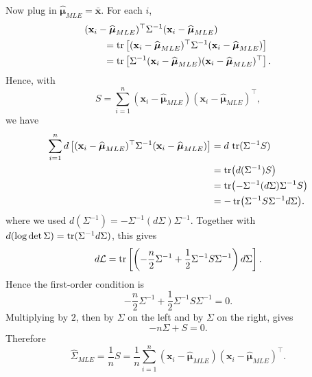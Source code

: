 \begin{pfbox}
Now plug in $\widehat{\boldsymbol{\mu}}_{MLE}=\bar{\mathbf{x}}$.
For each $i$,
\[
\begin{aligned}
    &(\mathbf{x}_i-\widehat{\boldsymbol{\mu}}_{MLE})^{\top}
    \Sigma^{-1}
    (\mathbf{x}_i-\widehat{\boldsymbol{\mu}}_{MLE})                 \\
    &\qquad =
    \operatorname{tr}\left[
        (\mathbf{x}_i-\widehat{\boldsymbol{\mu}}_{MLE})^{\top}
        \Sigma^{-1}
        (\mathbf{x}_i-\widehat{\boldsymbol{\mu}}_{MLE})
    \right]                                                        \\
    &\qquad =
    \operatorname{tr}\left[
        \Sigma^{-1}
        (\mathbf{x}_i-\widehat{\boldsymbol{\mu}}_{MLE})
        (\mathbf{x}_i-\widehat{\boldsymbol{\mu}}_{MLE})^{\top}
    \right].
\end{aligned}
\]
Hence, with
\[
    S
    =
    \sum_{i=1}^n
    (\mathbf{x}_i-\widehat{\boldsymbol{\mu}}_{MLE})
    (\mathbf{x}_i-\widehat{\boldsymbol{\mu}}_{MLE})^{\top},
\]
we have
\[
\begin{aligned}
    \sum_{i=1}^n
    d\left[
        (\mathbf{x}_i-\widehat{\boldsymbol{\mu}}_{MLE})^{\top}
        \Sigma^{-1}
        (\mathbf{x}_i-\widehat{\boldsymbol{\mu}}_{MLE})
    \right]
    &=
    d\,\operatorname{tr}(\Sigma^{-1}S)                                      \\
    &=
    \operatorname{tr}\bigl(d(\Sigma^{-1})S\bigr)                             \\
    &=
    \operatorname{tr}\bigl(-\Sigma^{-1}(d\Sigma)\Sigma^{-1}S\bigr)            \\
    &=
    -\operatorname{tr}\bigl(\Sigma^{-1}S\Sigma^{-1}d\Sigma\bigr).
\end{aligned}
\]
where we used $d(\Sigma^{-1})=-\Sigma^{-1}(d\Sigma)\Sigma^{-1}$.
Together with $d(\log\det\Sigma)=\operatorname{tr}(\Sigma^{-1}d\Sigma)$, this gives
\[
    d\mathcal{L}
    =
    \operatorname{tr}\left[
        \left(
            -\frac{n}{2}\Sigma^{-1}
            +
            \frac{1}{2}\Sigma^{-1}S\Sigma^{-1}
        \right)d\Sigma
    \right].
\]
Hence the first-order condition is
\[
    -\frac{n}{2}\Sigma^{-1}
    +
    \frac{1}{2}\Sigma^{-1}S\Sigma^{-1}=0.
\]
Multiplying by $2$, then by $\Sigma$ on the left and by $\Sigma$ on the right,
gives
\[
    -n\Sigma+S=0.
\]
Therefore
\[
    \widehat\Sigma_{MLE}
    =
    \frac{1}{n}S
    =
    \frac{1}{n}\sum_{i=1}^n
    (\mathbf{x}_i-\widehat{\boldsymbol{\mu}}_{MLE})
    (\mathbf{x}_i-\widehat{\boldsymbol{\mu}}_{MLE})^{\top}.
\]
\end{pfbox}

